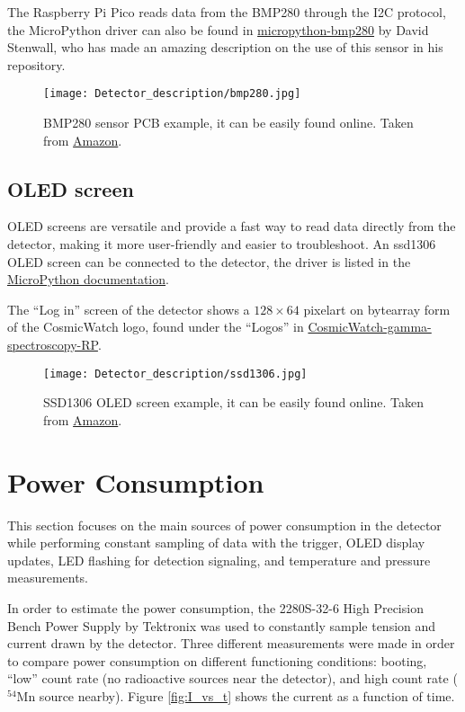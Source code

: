 The Raspberry Pi Pico reads data from the BMP280 through the I2C protocol, the MicroPython driver can also be found in \href{https://github.com/dafvid/micropython-bmp280}{micropython-bmp280} by David Stenwall, who has made an amazing description on the use of this sensor in his repository.

\begin{figure}[H]
  \centering
  \texttt{[image: Detector\_description/bmp280.jpg]}
  \caption{BMP280 sensor PCB example, it can be easily found online. Taken from \href{https://a.co/d/hhF7Vtp}{Amazon}.}
  \label{fig:bmp280}
\end{figure}

\subsection{OLED screen}

OLED screens are versatile and provide a fast way to read data directly from the detector, making it more user-friendly and easier to troubleshoot. An ssd1306 OLED screen can be connected to the detector, the driver is listed in the \href{https://github.com/micropython/micropython-lib/tree/master/micropython/drivers/display}{MicroPython documentation}.

The ``Log in'' screen of the detector shows a $128\times 64$ pixelart on bytearray form of the CosmicWatch logo, found under the ``Logos'' in \href{https://github.com/anvargasl/CosmicWatch-gamma-spectroscopy-RP}{CosmicWatch-gamma-spectroscopy-RP}.

\begin{figure}[H]
  \centering
  \texttt{[image: Detector\_description/ssd1306.jpg]}
  \caption{SSD1306 OLED screen example, it can be easily found online. Taken from \href{https://a.co/d/cGnBDLF}{Amazon}.}
  \label{fig:bssd1306}
\end{figure}

\section{Power Consumption}

This section focuses on the main sources of power consumption in the detector while performing constant sampling of data with the trigger, OLED display updates, LED flashing for detection signaling, and temperature and pressure measurements.

In order to estimate the power consumption, the 2280S-32-6 High Precision Bench Power Supply by Tektronix was used to constantly sample tension and current drawn by the detector. Three different measurements were made in order to compare power consumption on different functioning conditions: booting, ``low'' count rate (no radioactive sources near the detector), and high count rate ($^{54}$Mn source nearby). Figure \ref{fig:I_vs_t} shows the current as a function of time.

